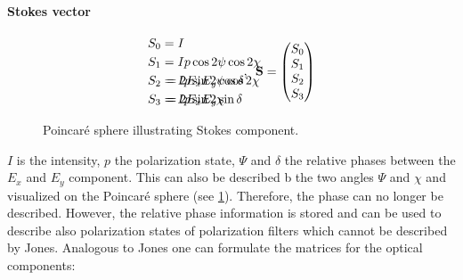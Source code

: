 \paragraph{Stokes vector}
\begin{align}
\begin{split}
S_0 &= I \\
S_1 &= I p \cos 2\psi \cos 2\chi \\
S_2 &= I p \sin 2\psi \cos 2\chi \\
S_3 &= I p \sin 2\chi
\end{split}
\hspace{-8em}
\begin{split}
& \\
& \\
&= 2 E_x E_y \cos \delta \\
&= 2 E_x E_y \sin \delta
\end{split}
, \enspace
\vec{S} =
\begin{pmatrix} S_0 \\ S_1 \\ S_2 \\ S_3\end{pmatrix}
\end{align}
% 
\begin{figure}[!t]
	\centering
	\caption{Poincar\'e sphere illustrating Stokes component.}
	\label{fig:stokesPoincare}
\end{figure}
% 
$I$ is the intensity, $p$ the polarization state, $\Psi$ and $\delta$ the relative phases between the $E_x$ and $E_y$ component.
This can also be described b the two angles $\Psi$ and $\chi$ and visualized on the Poincar\'e sphere (see \cref{fig:stokesPoincare}).
Therefore, the phase can no longer be described.
However, the relative phase information is stored and can be used to describe also polarization states of polarization filters which cannot be described by Jones.
Analogous to Jones one can formulate the matrices for the optical components:
% 
